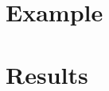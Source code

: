\documentclass[a4paper]{report}
\begin{document}
\chapter{Example}
\label{chap: Example}



%
%
%

\chapter{Results}

 

{}


%
\nocite{*}

\newpage{\pagestyle{empty} \cleardoublepage}
\listoftodos
\end{document}
